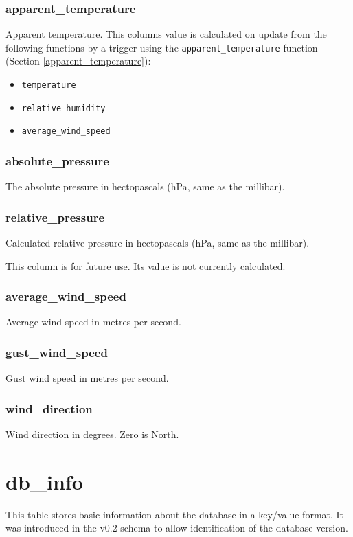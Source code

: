 \documentclass[a4paper,10pt]{book}
\begin{document}
\subsubsection{apparent\_temperature}
Apparent temperature. This columns value is calculated on update from the following functions by a trigger using the \verb|apparent_temperature| function (Section \ref{apparent_temperature}):
\begin{itemize}
\item \verb|temperature|
\item \verb|relative_humidity|
\item \verb|average_wind_speed|
\end{itemize}

\subsubsection{absolute\_pressure}
The absolute pressure in hectopascals (hPa, same as the millibar).

\subsubsection{relative\_pressure}
Calculated relative pressure in hectopascals (hPa, same as the millibar).

This column is for future use. Its value is not currently calculated.

\subsubsection{average\_wind\_speed}
Average wind speed in metres per second.

\subsubsection{gust\_wind\_speed}
Gust wind speed in metres per second.

\subsubsection{wind\_direction}
Wind direction in degrees. Zero is North.

\section{db\_info}
\label{tbl_db_info}
This table stores basic information about the database in a key/value format. It was introduced in the v0.2 schema to allow identification of the database version.
\end{document}
